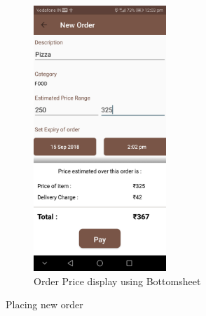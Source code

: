 \documentclass{report}
\begin{document}
\begin{figure}[h!]
\begin{subfigure}[h!]{.3\textwidth}
\includegraphics[width=5cm]{pay.jpg}
\caption{\centering \tiny Order Price display using Bottomsheet}
\end{subfigure}
\caption{\tiny Placing new order} 
\label{fig:NASA_Logo}
\end{figure}
\end{document}
